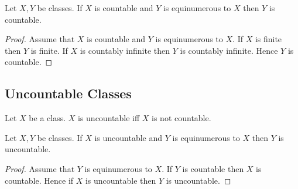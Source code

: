 \documentclass[10pt]{article}
\begin{document}
  \begin{forthel}
    \begin{proposition}[id=FOUNDATIONS_14_4182588499427328,printid]
      Let $X, Y$ be classes.
      If $X$ is countable and $Y$ is equinumerous to $X$ then $Y$ is countable.
    \end{proposition}
    \begin{proof}
      Assume that $X$ is countable and $Y$ is equinumerous to $X$.
      If $X$ is finite then $Y$ is finite.
      If $X$ is countably infinite then $Y$ is countably infinite.
      Hence $Y$ is countable.
    \end{proof}
  \end{forthel}


  \subsection*{Uncountable Classes}

  \begin{forthel}
    \begin{definition}[id=FOUNDATIONS_14_2411928395710464,printid]
      Let $X$ be a class.
      $X$ is uncountable iff $X$ is not countable.
    \end{definition}
  \end{forthel}

  \begin{forthel}
    \begin{proposition}[id=FOUNDATIONS_14_1073385358491648,printid]
      Let $X, Y$ be classes.
      If $X$ is uncountable and $Y$ is equinumerous to $X$ then $Y$ is uncountable.
    \end{proposition}
    \begin{proof}
      Assume that $Y$ is equinumerous to $X$.
      If $Y$ is countable then $X$ is countable.
      Hence if $X$ is uncountable then $Y$ is uncountable.
    \end{proof}
  \end{forthel}
\end{document}
